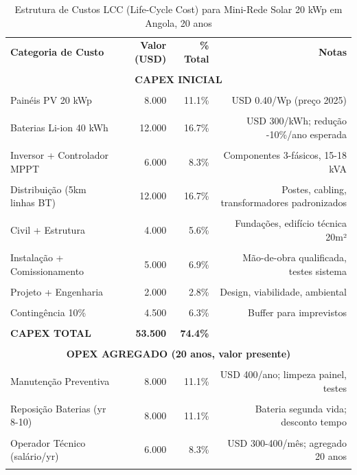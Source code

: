 \documentclass[12pt, a4paper]{article}
\begin{document}
\begin{table}[H]
\centering
\caption{Estrutura de Custos LCC (Life-Cycle Cost) para Mini-Rede Solar 20 kWp em Angola, 20 anos}
\label{tab:lcc_detailed}
\small
\begin{tabular}{|l|r|r|r|}
\hline\textbf{Categoria de Custo} &\textbf{Valor (USD)} &\textbf{\% Total} &\textbf{Notas} \\\\
\hline
\multicolumn{4}{|c|}{\textbf{CAPEX INICIAL}} \\\\
\hline
Painéis PV 20 kWp & 8.000 & 11.1\% & USD 0.40/Wp (preço 2025) \\\\
Baterias Li-ion 40 kWh & 12.000 & 16.7\% & USD 300/kWh; redução -10\%/ano esperada \\\\
Inversor + Controlador MPPT & 6.000 & 8.3\% & Componentes 3-fásicos, 15-18 kVA \\\\
Distribuição (5km linhas BT) & 12.000 & 16.7\% & Postes, cabling, transformadores padronizados \\\\
Civil + Estrutura & 4.000 & 5.6\% & Fundações, edifício técnica 20m² \\\\
Instalação + Comissionamento & 5.000 & 6.9\% & Mão-de-obra qualificada, testes sistema \\\\
Projeto + Engenharia & 2.000 & 2.8\% & Design, viabilidade, ambiental \\\\
Contingência 10\% & 4.500 & 6.3\% & Buffer para imprevistos \\\\
\hline\textbf{CAPEX TOTAL} &\textbf{53.500} &\textbf{74.4\%} & \\\\
\hline
\multicolumn{4}{|c|}{\textbf{OPEX AGREGADO (20 anos, valor presente)}} \\\\
\hline
Manutenção Preventiva & 8.000 & 11.1\% & USD 400/ano; limpeza painel, testes \\\\
Reposição Baterias (yr 8-10) & 8.000 & 11.1\% & Bateria segunda vida; desconto tempo \\\\
Operador Técnico (salário/yr) & 6.000 & 8.3\% & USD 300-400/mês; agregado 20 anos \\\\

\end{tabular}
\end{table}
\end{document}
